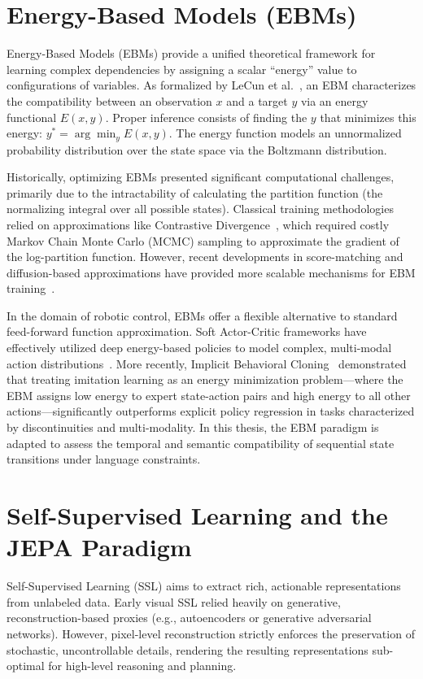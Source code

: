 \section{Energy-Based Models (EBMs)}

Energy-Based Models (EBMs) provide a unified theoretical framework for learning complex dependencies by assigning a scalar ``energy'' value to configurations of variables. As formalized by LeCun et al.~\cite{lecun2006tutorial}, an EBM characterizes the compatibility between an observation $x$ and a target $y$ via an energy functional $E(x,y)$. Proper inference consists of finding the $y$ that minimizes this energy: $y^\ast = \arg \min_y E(x,y)$. The energy function models an unnormalized probability distribution over the state space via the Boltzmann distribution.

Historically, optimizing EBMs presented significant computational challenges, primarily due to the intractability of calculating the partition function (the normalizing integral over all possible states). Classical training methodologies relied on approximations like Contrastive Divergence~\cite{hinton2002training}, which required costly Markov Chain Monte Carlo (MCMC) sampling to approximate the gradient of the log-partition function. However, recent developments in score-matching and diffusion-based approximations have provided more scalable mechanisms for EBM training~\cite{train-ebm}.

In the domain of robotic control, EBMs offer a flexible alternative to standard feed-forward function approximation. Soft Actor-Critic frameworks have effectively utilized deep energy-based policies to model complex, multi-modal action distributions~\cite{haarnoja2017reinforcement}. More recently, Implicit Behavioral Cloning~\cite{florence2022implicit} demonstrated that treating imitation learning as an energy minimization problem---where the EBM assigns low energy to expert state-action pairs and high energy to all other actions---significantly outperforms explicit policy regression in tasks characterized by discontinuities and multi-modality. In this thesis, the EBM paradigm is adapted to assess the temporal and semantic compatibility of sequential state transitions under language constraints.

\section{Self-Supervised Learning and the JEPA Paradigm}

Self-Supervised Learning (SSL) aims to extract rich, actionable representations from unlabeled data. Early visual SSL relied heavily on generative, reconstruction-based proxies (e.g., autoencoders or generative adversarial networks). However, pixel-level reconstruction strictly enforces the preservation of stochastic, uncontrollable details, rendering the resulting representations sub-optimal for high-level reasoning and planning.

